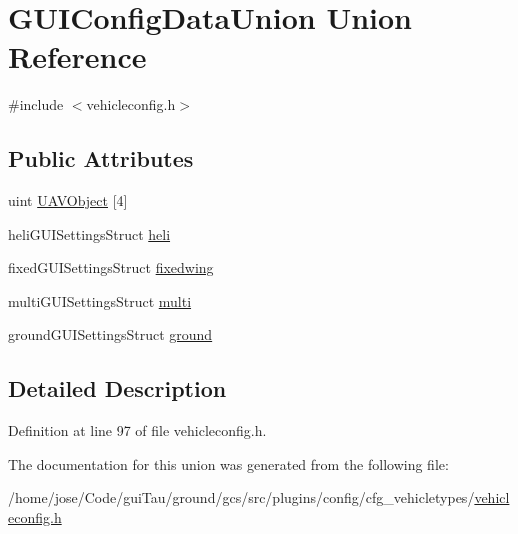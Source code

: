 \hypertarget{union_g_u_i_config_data_union}{\section{G\-U\-I\-Config\-Data\-Union Union Reference}
\label{union_g_u_i_config_data_union}
}


{\ttfamily \#include $<$vehicleconfig.\-h$>$}

\subsection*{Public Attributes}
\begin{DoxyCompactItemize}
\item 
uint \hyperlink{group___config_plugin_ga1a1fbf9187086cc92fac84f33f19402f}{U\-A\-V\-Object} \mbox{[}4\mbox{]}
\item 
heli\-G\-U\-I\-Settings\-Struct \hyperlink{group___config_plugin_gae9da8787d8f36ea6650045cf28c3b40d}{heli}
\item 
fixed\-G\-U\-I\-Settings\-Struct \hyperlink{group___config_plugin_ga10cc00a6af97a84e5f17358ed3c5eb34}{fixedwing}
\item 
multi\-G\-U\-I\-Settings\-Struct \hyperlink{group___config_plugin_ga2bab1814b15f618e30827215faea4f5e}{multi}
\item 
ground\-G\-U\-I\-Settings\-Struct \hyperlink{group___config_plugin_ga27dfb53cf12c8f8bb3a869bdfa8c11cf}{ground}
\end{DoxyCompactItemize}


\subsection{Detailed Description}


Definition at line 97 of file vehicleconfig.\-h.



The documentation for this union was generated from the following file\-:\begin{DoxyCompactItemize}
\item 
/home/jose/\-Code/gui\-Tau/ground/gcs/src/plugins/config/cfg\-\_\-vehicletypes/\hyperlink{vehicleconfig_8h}{vehicleconfig.\-h}\end{DoxyCompactItemize}
